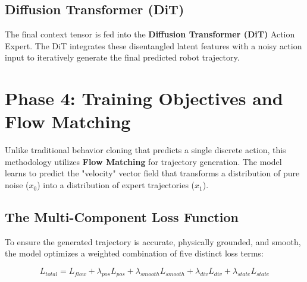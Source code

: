 \subsection{Diffusion Transformer (DiT)}
The final context tensor is fed into the \textbf{Diffusion Transformer (DiT)} Action Expert. The DiT integrates these disentangled latent features with a noisy action input to iteratively generate the final predicted robot trajectory.

\section{Phase 4: Training Objectives and Flow Matching}
\label{sec:phase4_training}

Unlike traditional behavior cloning that predicts a single discrete action, this methodology utilizes \textbf{Flow Matching} for trajectory generation. The model learns to predict the "velocity" vector field that transforms a distribution of pure noise ($x_0$) into a distribution of expert trajectories ($x_1$).

\subsection{The Multi-Component Loss Function}
To ensure the generated trajectory is accurate, physically grounded, and smooth, the model optimizes a weighted combination of five distinct loss terms:

$$L_{total} = L_{flow} + \lambda_{pos}L_{pos} + \lambda_{smooth}L_{smooth} + \lambda_{div}L_{div} + \lambda_{state}L_{state}$$

